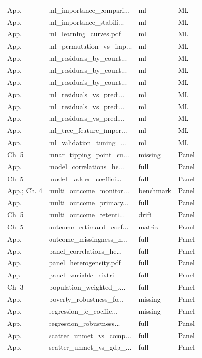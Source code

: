 \begin{longtable}{@{}p{}p{}p{}p{}@{}}
App. & ml\_importance\_compari... & ml & ML \\
App. & ml\_importance\_stabili... & ml & ML \\
App. & ml\_learning\_curves.pdf & ml & ML \\
App. & ml\_permutation\_vs\_imp... & ml & ML \\
App. & ml\_residuals\_by\_count... & ml & ML \\
App. & ml\_residuals\_by\_count... & ml & ML \\
App. & ml\_residuals\_by\_count... & ml & ML \\
App. & ml\_residuals\_vs\_predi... & ml & ML \\
App. & ml\_residuals\_vs\_predi... & ml & ML \\
App. & ml\_residuals\_vs\_predi... & ml & ML \\
App. & ml\_tree\_feature\_impor... & ml & ML \\
App. & ml\_validation\_tuning\_... & ml & ML \\
Ch. 5 & mnar\_tipping\_point\_cu... & missing & Panel \\
App. & model\_correlations\_he... & full & Panel \\
Ch. 5 & model\_ladder\_coeffici... & full & Panel \\
App.; Ch. 4 & multi\_outcome\_monitor... & benchmark & Panel \\
App. & multi\_outcome\_primary... & full & Panel \\
Ch. 5 & multi\_outcome\_retenti... & drift & Panel \\
Ch. 5 & outcome\_estimand\_coef... & matrix & Panel \\
App. & outcome\_missingness\_h... & full & Panel \\
App. & panel\_correlations\_he... & full & Panel \\
App. & panel\_heterogeneity.pdf & full & Panel \\
App. & panel\_variable\_distri... & full & Panel \\
Ch. 3 & population\_weighted\_t... & full & Panel \\
App. & poverty\_robustness\_fo... & missing & Panel \\
App. & regression\_fe\_coeffic... & missing & Panel \\
App. & regression\_robustness... & full & Panel \\
App. & scatter\_unmet\_vs\_comp... & full & Panel \\
App. & scatter\_unmet\_vs\_gdp\_... & full & Panel \\

\end{longtable}

